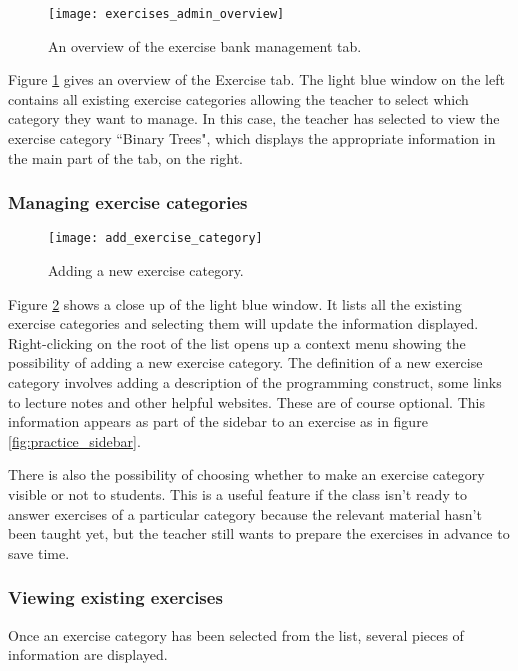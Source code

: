 \begin{figure}[H]
\centering
\texttt{[image: exercises\_admin\_overview]}
\caption{An overview of the exercise bank management tab.}
\label{fig:exercises_admin_overview}
\end{figure}

Figure \ref{fig:exercises_admin_overview} gives an overview of the Exercise tab. The light blue window on the left contains all existing exercise categories allowing the teacher to select which category they want to manage. In this case, the teacher has selected to view the exercise category ``Binary Trees", which displays the appropriate information in the main part of the tab, on the right.

\subsubsection{Managing exercise categories}
\begin{figure}[H]
\centering
\texttt{[image: add\_exercise\_category]}
\caption{Adding a new exercise category.}
\label{fig:add_exercise_category}
\end{figure}

Figure \ref{fig:add_exercise_category} shows a close up of the light blue window. It lists all the existing exercise categories and selecting them will update the information displayed. Right-clicking on the root of the list opens up a context menu showing the possibility of adding a new exercise category. The definition of a new exercise category involves adding a description of the programming construct, some links to lecture notes and other helpful websites. These are of course optional. This information appears as part of the sidebar to an exercise as in figure \ref{fig:practice_sidebar}.\newline

There is also the possibility of choosing whether to make an exercise category visible or not to students. This is a useful feature if the class isn't ready to answer exercises of a particular category because the relevant material hasn't been taught yet, but the teacher still wants to prepare the exercises in advance to save time.
\subsubsection{Viewing existing exercises}
Once an exercise category has been selected from the list, several pieces of information are displayed.

